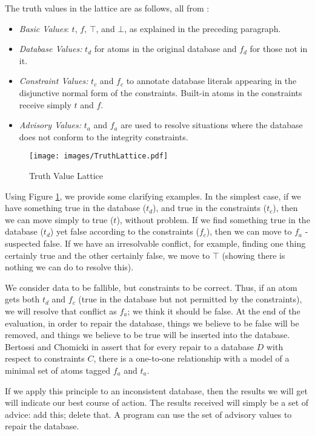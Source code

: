 \documentclass[a4paper]{report}
\begin{document}
The truth values in the lattice are as follows, all from \cite{CQ}:

\begin{itemize}
\item \textit{Basic Values}: $t$, $f$, $\top$, and $\bot$, as explained in the preceding paragraph. 
\item \textit{Database Values:} $t_d$ for atoms in the original database and $f_d$ for those not in it.
\item \textit{Constraint Values:} $t_c$ and $f_c$ to annotate database literals appearing in the disjunctive normal form of the constraints. Built-in atoms in the constraints receive simply $t$ and $f$.
\item \textit{Advisory Values:} $t_a$ and $f_a$ are used to resolve situations where the database does not conform to the integrity constraints. 
\end{itemize}

\begin{figure}[!h]
  \centering \texttt{[image: images/TruthLattice.pdf]}
  \caption[Truth Value Lattice]{Truth Value Lattice \cite{CQ}}
  \label{TruthLattice}
\end{figure}


Using Figure \ref{TruthLattice}, we provide some clarifying examples. In the simplest case, if we have something true in the database ($t_d$), and true in the constraints ($t_c$), then we can move simply to true ($t$), without problem. If we find something true in the database ($t_d$) yet false according to the constraints ($f_c$), then we can move to $f_a$ - suspected false. If we have an irresolvable conflict, for example, finding one thing certainly true and the other certainly false, we move to $\top$ (showing there is nothing we can do to resolve this).

We consider data to be fallible, but constraints to be correct. Thus, if an atom gets both $t_d$ and $f_c$ (true in the database but not permitted by the constraints), we will resolve that conflict as $f_a$; we think it should be false. At the end of the evaluation, in order to repair the database, things we believe to be false will be removed, and things we believe to be true will be inserted into the database. Bertossi and Chomicki in \cite{CQ} assert that for every repair to a database $D$ with respect to constraints $C$, there is a one-to-one relationship with a model of a minimal set of atoms tagged $f_a$ and $t_a$.

If we apply this principle to an inconsistent database, then the results we will get will indicate our best course of action. The results received will simply be a set of advice: add this; delete that. A program can use the set of advisory values to repair the database.
\end{document}
